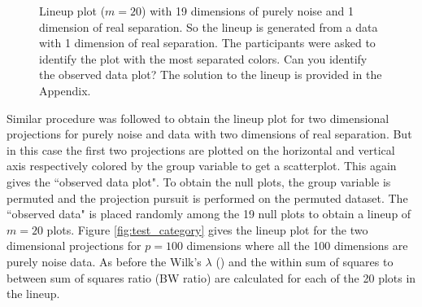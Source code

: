 \documentclass[12]{article}
\begin{document}
%
\begin{figure}[hbtp]
   \centering
       \caption{Lineup plot ($m=20$) with 19 dimensions of purely noise  and 1 dimension of real separation. So the lineup is generated from a data with 1 dimension of real separation. The participants were asked to identify the plot with the most separated colors. Can you identify the observed data plot? The solution to the lineup is provided in the Appendix. }
     \label{fig:test_category_1d}
\end{figure}
%
%

Similar procedure was followed to obtain the lineup plot for two dimensional projections for purely noise and data with two dimensions of real separation. But in this case the first two projections are plotted on the horizontal and vertical axis respectively colored by the group variable to get a scatterplot. This again gives the ``observed data plot". To obtain the null plots, the group variable is permuted and the projection pursuit is performed on the permuted dataset. The ``observed data" is placed randomly among the 19 null plots to obtain a lineup of $m = 20$ plots. Figure \ref{fig:test_category} gives the lineup plot for the two dimensional projections for $p =100$ dimensions where all the 100 dimensions are purely noise data. As before the Wilk's $\lambda$ (\cite{JW02})  and the within sum of squares to between sum of squares ratio (BW ratio) are calculated for each of the 20 plots in the lineup. 
 
\end{document}
